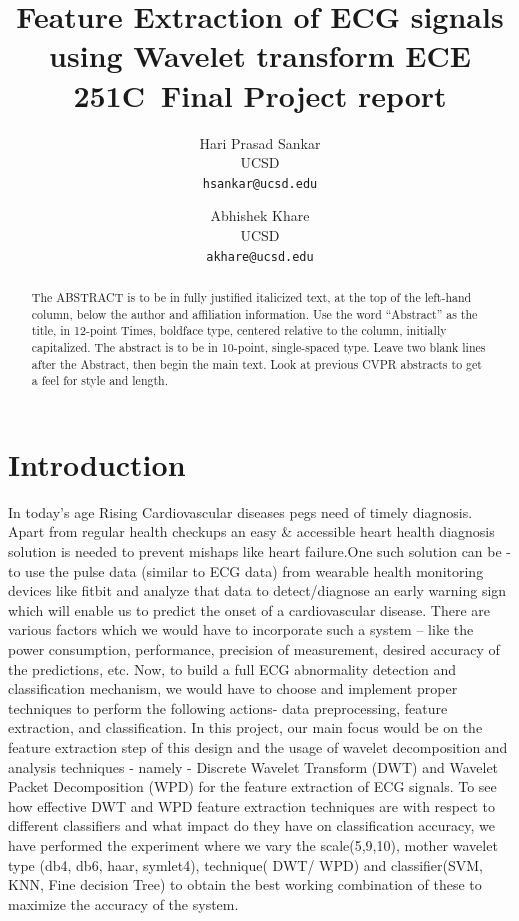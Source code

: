 \documentclass[10pt,twocolumn,letterpaper]{article}
\def\confName{ECE 251C}
\begin{document}
\title{Feature Extraction of ECG signals using Wavelet transform \confName~Final Project report}

\author{Hari Prasad Sankar\\
UCSD\\
{\tt\small hsankar@ucsd.edu}
\and
Abhishek Khare\\
UCSD\\
{\tt\small akhare@ucsd.edu}
}
\maketitle

\begin{abstract}
   The ABSTRACT is to be in fully justified italicized text, at the top of the left-hand column, below the author and affiliation information.
   Use the word ``Abstract'' as the title, in 12-point Times, boldface type, centered relative to the column, initially capitalized.
   The abstract is to be in 10-point, single-spaced type.
   Leave two blank lines after the Abstract, then begin the main text.
   Look at previous CVPR abstracts to get a feel for style and length.
\end{abstract}

\section{Introduction}
\label{sec:intro}
In today’s age Rising Cardiovascular diseases pegs need of timely diagnosis. Apart from regular health checkups an easy \& accessible heart health diagnosis solution is needed to prevent mishaps like heart failure.One such solution can be - to use the pulse data (similar to ECG data) from wearable health monitoring devices like fitbit and analyze that data to detect/diagnose an early warning sign which will enable us to predict the onset of a cardiovascular disease. There are various factors which we would have to incorporate such a system – like the power consumption, performance, precision of measurement, desired accuracy of the predictions, etc.
Now, to build a full ECG abnormality detection and classification mechanism, we would have to choose and implement proper techniques to perform the following actions- data preprocessing, feature extraction, and classification. In this project, our main focus would be on the feature extraction step of this design and the usage of wavelet decomposition and analysis techniques - namely - Discrete Wavelet Transform (DWT) and Wavelet Packet Decomposition (WPD) for the feature extraction of ECG signals.
To see how effective DWT and WPD feature extraction techniques are with respect to different classifiers and what impact do they have on classification accuracy, we have performed the experiment where we vary the scale(5,9,10), mother wavelet type (db4, db6, haar, symlet4), technique( DWT/ WPD) and classifier(SVM, KNN, Fine decision Tree)  to obtain the best working combination of these to maximize the accuracy of the system.
\end{document}
